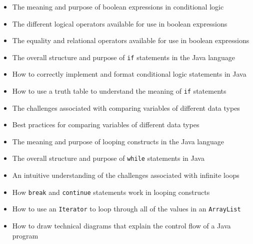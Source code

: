 \documentclass[11pt]{article}
\begin{document}
\begin{itemize}

  \itemsep 0in

  \item The meaning and purpose of boolean expressions in conditional logic

  \item The different logical operators available for use in boolean expressions

  \item The equality and relational operators available for use in boolean expressions

  \item The overall structure and purpose of {\tt if} statements in the Java
    language

  \item How to correctly implement and format conditional logic statements in
    Java

  \item How to use a truth table to understand the meaning of {\tt if} statements

  \item The challenges associated with comparing variables of different data
    types

  \item Best practices for comparing variables of different data types

  \item The meaning and purpose of looping constructs in the Java language

  \item The overall structure and purpose of {\tt while} statements in Java

  \item An intuitive understanding of the challenges associated with infinite
    loops

  \item How {\tt break} and {\tt continue} statements work in looping constructs

  \item How to use an {\tt Iterator} to loop through all of the values in an
    {\tt ArrayList}

  \item How to draw technical diagrams that explain the control flow of a Java
    program

\end{itemize}
\end{document}
